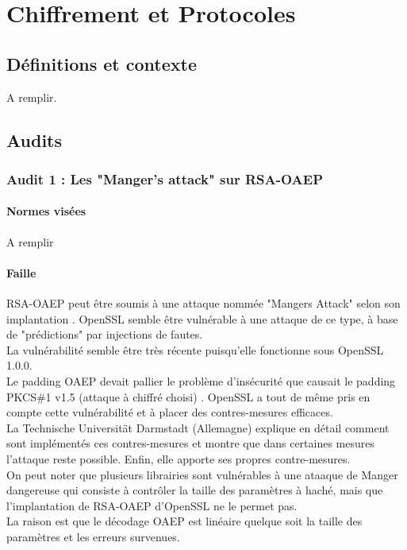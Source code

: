 \chapter{Chiffrement et Protocoles}

\section{Définitions et contexte}

A remplir.

\section{Audits}
	\subsection{Audit 1 : Les "Manger's attack" sur RSA-OAEP}
		\subsubsection{Normes visées}

		A remplir	
	
		\subsubsection{Faille}
		
			RSA-OAEP peut être soumis à une attaque nommée "Mangers Attack" selon son implantation \cite{mangers2010falko}. OpenSSL semble être vulnérable à une attaque de ce type, à base de "prédictions" par injections de fautes.\\
			La vulnérabilité semble être très récente puisqu'elle fonctionne sous OpenSSL 1.0.0.\\

			Le padding OAEP devait pallier le problème d'insécurité que causait le padding PKCS\#1 v1.5 (attaque à chiffré choisi) \cite{bleichenbacherPCKS}. OpenSSL a tout de même pris en compte cette vulnérabilité et à placer des contres-mesures efficaces.\\
			
			La Technische Universität Darmstadt (Allemagne) explique en détail comment sont implémentés ces contres-mesures et montre que dans certaines mesures l'attaque reste possible. Enfin, elle apporte ses propres contre-mesures.\\
			
			On peut noter que plusieurs librairies sont vulnérables à une ataaque de Manger dangereuse qui consiste à contrôler la taille des paramètres à haché, mais que l'implantation de RSA-OAEP d'OpenSSL ne le permet pas.\\
			La raison est que le décodage OAEP est linéaire quelque soit la taille des paramètres et les erreurs survenues.
			
